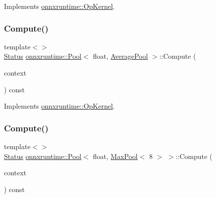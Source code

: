Implements \mbox{\hyperlink{classonnxruntime_1_1OpKernel_a9eca8656a78b1b3ab9d3351a12798650}{onnxruntime\+::\+Op\+Kernel}}.

\mbox{\label{classonnxruntime_1_1Pool_a7c4951dbf40c8a96595a33846f6def61}} 
\subsubsection{\texorpdfstring{Compute()}{Compute()}\hspace{0.1cm}{\footnotesize\ttfamily [3/4]}}
{\footnotesize\ttfamily template$<$$>$ \\
\mbox{\hyperlink{classonnxruntime_1_1common_1_1Status}{Status}} \mbox{\hyperlink{classonnxruntime_1_1Pool}{onnxruntime\+::\+Pool}}$<$ float, \mbox{\hyperlink{classonnxruntime_1_1AveragePool}{Average\+Pool}} $>$\+::Compute (\begin{DoxyParamCaption}\item[{\mbox{\hyperlink{classonnxruntime_1_1OpKernelContext}{Op\+Kernel\+Context}} $\ast$}]{context }\end{DoxyParamCaption}) const\hspace{0.3cm}{\ttfamily [virtual]}}



Implements \mbox{\hyperlink{classonnxruntime_1_1OpKernel_a9eca8656a78b1b3ab9d3351a12798650}{onnxruntime\+::\+Op\+Kernel}}.

\mbox{\label{classonnxruntime_1_1Pool_a10f34e111b6792c1e543610c4c91765e}} 
\subsubsection{\texorpdfstring{Compute()}{Compute()}\hspace{0.1cm}{\footnotesize\ttfamily [4/4]}}
{\footnotesize\ttfamily template$<$$>$ \\
\mbox{\hyperlink{classonnxruntime_1_1common_1_1Status}{Status}} \mbox{\hyperlink{classonnxruntime_1_1Pool}{onnxruntime\+::\+Pool}}$<$ float, \mbox{\hyperlink{classonnxruntime_1_1MaxPool}{Max\+Pool}}$<$ 8 $>$ $>$\+::Compute (\begin{DoxyParamCaption}\item[{\mbox{\hyperlink{classonnxruntime_1_1OpKernelContext}{Op\+Kernel\+Context}} $\ast$}]{context }\end{DoxyParamCaption}) const\hspace{0.3cm}{\ttfamily [virtual]}}



